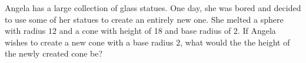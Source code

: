 Angela has a large collection of glass statues. One day, she was bored and decided to use some of her statues to create an entirely new one. She melted a sphere with radius $12$ and a cone with height of 18 and base radius of $2$. If Angela wishes to create a new cone with a base radius $2$, what would the the height of the newly created cone be?
